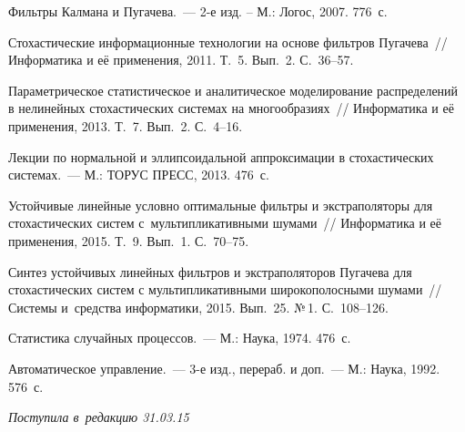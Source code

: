 \begin{multicols}{2}
{}



{\small\frenchspacing
 {%
 \begin{thebibliography}{9}

Фильтры Калмана и Пугачева.~--- 2-е изд. -- М.: Логос, 2007. 776~с.


 Стохастические информационные технологии на основе фильтров Пугачева~// Информатика и её применения, 2011. Т.~5. Вып.~2. С.~36--57.

  Параметрическое статистическое и аналитическое моделирование распределений в нелинейных стохастических системах на многообразиях~// Информатика и её применения, 2013. Т.~7. Вып.~2. С.~4--16.



 Лекции по нормальной и эллипсоидальной аппроксимации в стохастических системах.~--- М.: ТОРУС ПРЕСС, 2013. 476~с.

Устойчивые линейные условно оптимальные фильтры и экстраполяторы для стохастических систем с~мультипликативными шумами~// Информатика и её применения, 2015. Т.~9. Вып.~1. С.~70--75.

Синтез устойчивых линей\-ных фильтров и экстраполяторов Пугачева для стохастических систем с мультипликативными широкополосными шумами~// Системы и~средства информатики, 2015. Вып.~25. №\,1.
С.~108--126.

 Статистика случайных процессов.~--- М.: Наука, 1974. 476~с.

 Автоматическое управление.~--- 3-е изд., перераб. и доп.~--- М.: Наука, 1992. 576~с.
 \end{thebibliography}

 }
 }

\end{multicols}

\vspace*{-3pt}

\hfill{\small\textit{Поступила в~редакцию 31.03.15}}


\vspace*{12pt}

